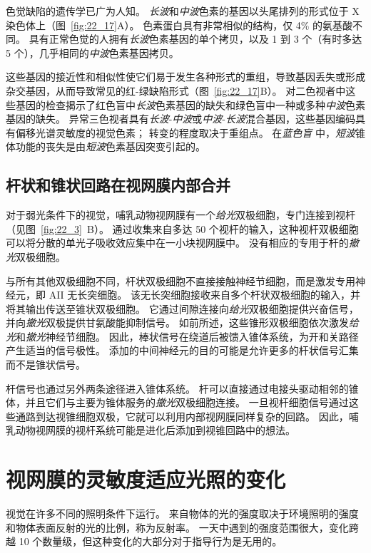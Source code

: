 色觉缺陷的遗传学已广为人知。
\textit{长波}和\textit{中波}色素的基因以头尾排列的形式位于 X 染色体上（图~\ref{fig:22_17}A）。
色素蛋白具有非常相似的结构，仅 4\% 的氨基酸不同。 
具有正常色觉的人拥有\textit{长波}色素基因的单个拷贝，以及 1 到 3 个（有时多达 5 个），几乎相同的\textit{中波}色素基因拷贝。


这些基因的接近性和相似性使它们易于发生各种形式的重组，导致基因丢失或形成杂交基因，从而导致常见的红-绿缺陷形式（图~\ref{fig:22_17}B）。
对二色视者中这些基因的检查揭示了红色盲中\textit{长波}色素基因的缺失和绿色盲中一种或多种\textit{中波}色素基因的缺失。
异常三色视者具有\textit{长波}-\textit{中波}或\textit{中波}-\textit{长波}混合基因，这些基因编码具有偏移光谱灵敏度的视觉色素；
转变的程度取决于重组点。
在\textit{蓝色盲} 中，\textit{短波}锥体功能的丧失是由\textit{短波}色素基因突变引起的。



\subsection{杆状和锥状回路在视网膜内部合并}

对于弱光条件下的视觉，哺乳动物视网膜有一个\textit{给光}双极细胞，专门连接到视杆（见图~\ref{fig:22_3}~B）。
通过收集来自多达 50 个视杆的输入，这种视杆双极细胞可以将分散的单光子吸收效应集中在一小块视网膜中。 
没有相应的专用于杆的\textit{撤光}双极细胞。


与所有其他双极细胞不同，杆状双极细胞不直接接触神经节细胞，而是激发专用神经元，即 AII 无长突细胞。
该无长突细胞接收来自多个杆状双极细胞的输入，并将其输出传送至锥状双极细胞。
它通过间隙连接向\textit{给光}双极细胞提供兴奋信号，并向\textit{撤光}双极提供甘氨酸能抑制信号。
如前所述，这些锥形双极细胞依次激发\textit{给光}和\textit{撤光}神经节细胞。
因此，棒状信号在绕道后被馈入锥体系统，为开和关路径产生适当的信号极性。
添加的中间神经元的目的可能是允许更多的杆状信号汇集而不是锥状信号。


杆信号也通过另外两条途径进入锥体系统。
杆可以直接通过电接头驱动相邻的锥体，并且它们与主要为锥体服务的\textit{撤光}双极细胞连接。
一旦视杆细胞信号通过这些通路到达视锥细胞双极，它就可以利用内部视网膜同样复杂的回路。
因此，哺乳动物视网膜的视杆系统可能是进化后添加到视锥回路中的想法。



\section{视网膜的灵敏度适应光照的变化}

视觉在许多不同的照明条件下运行。
来自物体的光的强度取决于环境照明的强度和物体表面反射的光的比例，称为反射率。
一天中遇到的强度范围很大，变化跨越 10 个数量级，但这种变化的大部分对于指导行为是无用的。


